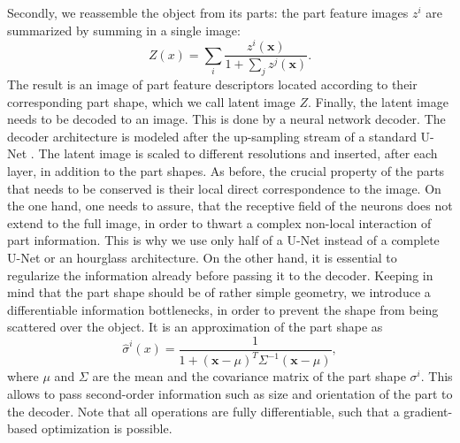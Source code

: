 		Secondly, we reassemble the object from its parts: the part feature images $z^i$ are summarized by summing in a single image:
		\begin{equation}
			Z(x) = \sum_i \frac{z^i(\mathbf{x})}{1 + \sum_j z^j(\mathbf{x})}.
		\end{equation}
		The result is an image of part feature descriptors located according to their corresponding part shape, which we call latent image $Z$.
		Finally, the latent image needs to be decoded to an image. This is done by a neural network decoder. The decoder architecture is modeled after the up-sampling stream of a standard U-Net \cite{ronneberger15unet}. The latent image is scaled to different resolutions and inserted, after each layer, in addition to the part shapes. As before, the crucial property of the parts that needs to be conserved is their local direct correspondence to the image. On the one hand, one needs to assure, that the receptive field of the neurons does not extend to the full image, in order to thwart a complex non-local interaction of part information. This is why we use only half of a U-Net instead of a complete U-Net or an hourglass architecture.
		On the other hand, it is essential to regularize the information already before passing it to the decoder. Keeping in mind that the part shape should be of rather simple geometry, we introduce a differentiable information bottlenecks, in order to prevent the shape from being scattered over the object. It is an approximation of the part shape as
		\begin{equation}\label{eq:approx}
			\hat {\sigma}^i(x) = \frac{1}{1 + (\mathbf{x} -\mu)^T \Sigma^{-1} (\mathbf{x} - \mu)},
		\end{equation}
		where $\mu$ and $\Sigma$ are the mean and the covariance matrix of the part shape ${\sigma}^i$. This allows to pass second-order information such as size and orientation of the part to the decoder. Note that all operations are fully differentiable, such that a gradient-based optimization is possible.


